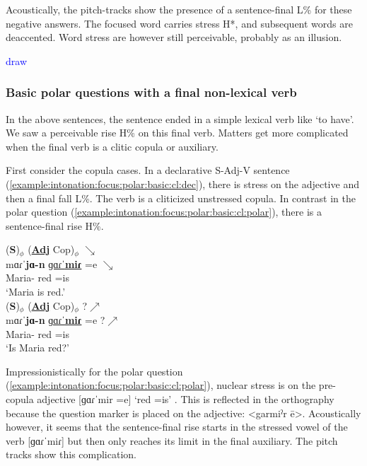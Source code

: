 Acoustically, the pitch-tracks show the presence of a sentence-final L\% for these negative answers. The focused word carries stress H*, and subsequent words are deaccented. Word     stress are however still perceivable, probably as an illusion.  

\textcolor{blue}{draw}

\subsubsection{Basic polar questions with a final non-lexical verb}\label{section:intonation:focus:polar:finalCl} 

In the above sentences, the sentence ended in a simple lexical verb like `to have'. We saw a perceivable rise H\% on this final verb. Matters get more complicated when the final verb is a clitic copula or auxiliary. 

First consider the copula cases. In a declarative S-Adj-V sentence (\ref{example:intonation:focus:polar:basic:cl:dec}), there is stress on the adjective and then a final fall L\%. The verb is a cliticized unstressed copula. In contrast in the polar question (\ref{example:intonation:focus:polar:basic:cl:polar}), there is a sentence-final rise H\%. 


\begin{exe}
	\ex \begin{xlist}
		\ex \glll   (\textbf{S})$_\phi$ (\underline{\textbf{Adj}} Cop)$_\phi$ $\searrow$ \\
		mɑɾˈ\textbf{jɑ-n} \underline{ɡɑɾˈ\textbf{miɾ}} =e  $\searrow$\\
		Maria-{} red =is   \\
		\trans `Maria is red.'
		\label{example:intonation:focus:polar:basic:cl:dec}
		\\  
		\ex \glll   (\textbf{S})$_\phi$ (\underline{\textbf{Adj}} Cop)$_\phi$ ?$\nearrow$ \\
		mɑɾˈ\textbf{jɑ-n} {\underline{ɡɑɾˈ\textbf{miɾ}}} =e  ?$\nearrow$ \\
		Maria-{} red   =is \\ 
		\trans `Is Maria    red?' 
		\label{example:intonation:focus:polar:basic:cl:polar}
		\\ 
		
	\end{xlist}
\end{exe}

Impressionistically for the polar question (\ref{example:intonation:focus:polar:basic:cl:polar}), nuclear stress is on the pre-copula adjective [ɡɑɾˈmir =e] `red =is' . This is reflected in the orthography because the question marker  is placed on the adjective:  <garmiˀr ē>. Acoustically however, it seems that the sentence-final rise starts in the stressed vowel of the verb [ɡɑɾˈmiɾ] but then only reaches its limit in the final auxiliary. The pitch tracks show this complication. 


